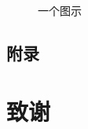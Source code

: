\documentclass{fudan}
\begin{document}
\begin{figure}[!h]
\begin{center}
\fbox{\rule{0pt}{2in} \rule{0.9\linewidth}{0pt}}
\end{center}
\caption{一个图示}
\end{figure}

\nocite{*} %

\begin{appendix}

\chapter{附录}

\end{appendix}

\backmatter



\chapter{致\hspace{1.5em}谢}

\makebackcover
\end{document}
